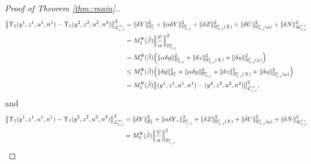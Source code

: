 \documentclass[10pt]{article} %
\newcommand\cH{\mathcal H}
\newcommand\cL{\mathcal L}
\newcommand\cS{\mathcal S}
\newcommand{\smalltext}[1]{\text{\fontsize{4}{4}\selectfont$#1$}}
\def \H{\mathbb{H}}
\begin{document}
\begin{proof}[Proof of Theorem \ref{thm::main}.]
	\begin{align*}
		\big\| \Upsilon_1(y^1,z^1,u^1,n^1) - \Upsilon_1(y^2,z^2,u^2,n^2) \big\|^2_{\cL^\smalltext{(1)}_{\smalltext{T}\smalltext{,}\smalltext{\hat\beta}}} 
		&= \|\delta Y\|^2_{\cS^\smalltext{2}_\smalltext{T}} + \|\alpha\delta Y\|^2_{\H^\smalltext{2}_{\smalltext{T}\smalltext{,}\smalltext{\hat\beta}}} + \|\delta Z\|^2_{\H^\smalltext{2}_{\smalltext{T}\smalltext{,}\smalltext{\hat\beta}}(X)} + \|\delta U\|^2_{\H^\smalltext{2}_{\smalltext{T}\smalltext{,}\smalltext{\hat\beta}}(\mu)} + \|\delta N\|^2_{\cH^{\smalltext{2}\smalltext{,}\smalltext{\perp}}_{\smalltext{T}\smalltext{,}\smalltext{\hat\beta}}} \nonumber\\
		&= M^\Phi_1(\hat\beta) \Big\| \frac{\psi}{\alpha} \Big\|^2_{\H^\smalltext{2}_{\smalltext{T}\smalltext{,}\smalltext{\hat\beta}}} \nonumber\\
		&= M^\Phi_1(\hat\beta) \Big(\|\alpha\delta y\|^2_{\H^\smalltext{2}_{\smalltext{T}\smalltext{,}\smalltext{\hat\beta}}} + \|\delta z\|^2_{\H^\smalltext{2}_{\smalltext{T}\smalltext{,}\smalltext{\hat\beta}}(X)} + \|\delta u\|^2_{\H^\smalltext{2}_{\smalltext{T}\smalltext{,}\smalltext{\hat\beta}}(\mu)} \Big)  \nonumber\\
		&\leq M^\Phi_1(\hat\beta) \Big( \|\delta y\|^2_{\cS^\smalltext{2}_\smalltext{T}} + \|\alpha\delta y\|^2_{\H^\smalltext{2}_{\smalltext{T}\smalltext{,}\smalltext{\hat\beta}}} + \|\delta z\|^2_{\H^\smalltext{2}_{\smalltext{T}\smalltext{,}\smalltext{\hat\beta}}(X)} + \|\delta u\|^2_{\H^\smalltext{2}_{\smalltext{T}\smalltext{,}\smalltext{\hat\beta}}(\mu)} \Big)  \nonumber\\
		&= M^\Phi_1(\hat\beta) \big\|(y^1, z^1, u^1, n^1) - (y^2, z^2, u^2, n^2)\big\|^2_{\cL^\smalltext{(1)}_{\smalltext{T}\smalltext{,}\smalltext{\hat\beta}}},
	\end{align*}
	and
	\begin{align*}
		\big\| \Upsilon_1(y^1,z^1,u^1,n^1) - \Upsilon_1(y^2,z^2,u^2,n^2) \big\|^2_{\cL^\smalltext{(3)}_{\smalltext{T}\smalltext{,}\smalltext{\hat\beta}}} 
		&= \|\delta Y\|^2_{\cS^\smalltext{2}_\smalltext{T}} + \|\alpha\delta Y_-\|^2_{\H^\smalltext{2}_{\smalltext{T}\smalltext{,}\smalltext{\hat\beta}}} + \|\delta Z\|^2_{\H^\smalltext{2}_{\smalltext{T}\smalltext{,}\smalltext{\hat\beta}}(X)} + \|\delta U\|^2_{\H^\smalltext{2}_{\smalltext{T}\smalltext{,}\smalltext{\hat\beta}}(\mu)} + \|\delta N\|^2_{\cH^{\smalltext{2}\smalltext{,}\smalltext{\perp}}_{\smalltext{T}\smalltext{,}\smalltext{\hat\beta}}} \nonumber\\
		&= M^\Phi_3(\hat\beta)\Big\| \frac{\psi}{\alpha} \Big\|^2_{\H^\smalltext{2}_{\smalltext{T}\smalltext{,}\smalltext{\hat\beta}}} \nonumber\\

\end{align*}
\end{proof}
\end{document}
